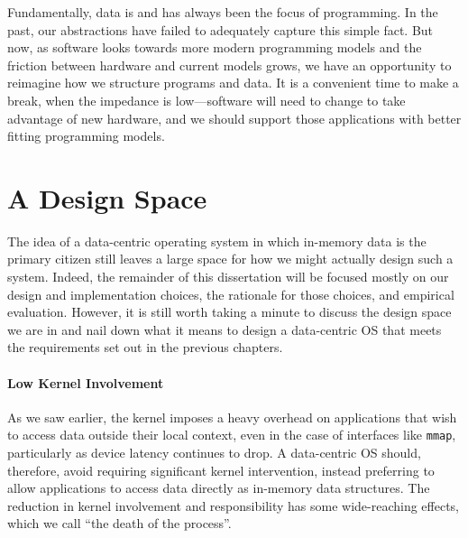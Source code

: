 Fundamentally, data is and has always been the focus of programming. In the past, our abstractions have failed to
adequately capture this simple fact. But now, as software looks towards more modern programming models and the friction
between hardware and current models grows, we have an opportunity to reimagine how we structure programs and data.
It is a convenient time to make a break, when the impedance is low---software will need to change to take advantage of
new hardware, and we should support those applications with better fitting programming models.





\section{A Design Space}

The idea of a data-centric operating system in which in-memory data is the primary citizen still leaves a large space for how
we might actually design such a system. Indeed, the remainder of this dissertation will be focused mostly on our design and
implementation choices, the rationale for those choices, and empirical evaluation. However, it is still worth taking a
minute to discuss the design space we are in and nail down what it means to design a data-centric OS that meets the
requirements set out in the previous chapters.

\paragraph{Low Kernel Involvement} As we saw earlier, the kernel imposes a heavy overhead on applications that wish to
access data outside their local context, even in the case of interfaces like \texttt{mmap}, particularly as device
latency continues to drop. A data-centric OS should, therefore, avoid requiring significant kernel intervention, instead
preferring to allow applications to access data directly as in-memory data structures. The reduction in
kernel involvement and responsibility has some wide-reaching effects, which we call ``the death of the process''.

